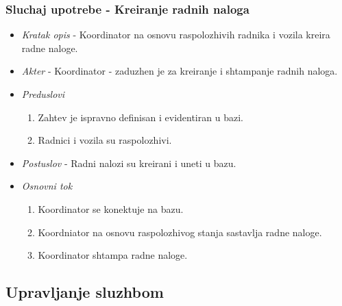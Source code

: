 \documentclass[10 pt]{article}
\begin{document}
	
	\subsubsection{Sluchaj upotrebe - Kreiranje radnih naloga}
	
		\begin{itemize}
		
			\item\textit{Kratak opis} - Koordinator na osnovu raspolozhivih radnika i vozila kreira radne naloge.
			
			\item\textit{Akter} - Koordinator - zaduzhen je za kreiranje i shtampanje radnih naloga.
			
			\item\textit{Preduslovi}
				\begin{enumerate}
					\item Zahtev je ispravno definisan i evidentiran u bazi.
					\item Radnici i vozila su raspolozhivi.
				\end{enumerate}
			
			\item\textit{Postuslov} - Radni nalozi su kreirani i uneti u bazu.
			
			\item\textit{Osnovni tok}
				\begin{enumerate}
					\item Koordinator se konektuje na bazu.
					\item Koordniator na osnovu raspolozhivog stanja sastavlja radne naloge.
					\item Koordinator shtampa radne naloge.
				\end{enumerate}
			
		\end{itemize}
	
	
	\subsection{Upravljanje sluzhbom}
	
\end{document}
